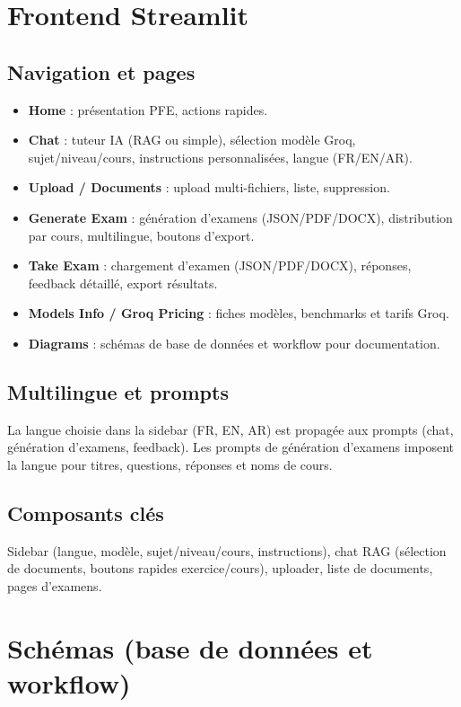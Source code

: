 \section{Frontend Streamlit}

\subsection{Navigation et pages}
\begin{itemize}
    \item \textbf{Home} : présentation PFE, actions rapides.
    \item \textbf{Chat} : tuteur IA (RAG ou simple), sélection modèle Groq, sujet/niveau/cours, instructions personnalisées, langue (FR/EN/AR).
    \item \textbf{Upload / Documents} : upload multi-fichiers, liste, suppression.
    \item \textbf{Generate Exam} : génération d'examens (JSON/PDF/DOCX), distribution par cours, multilingue, boutons d'export.
    \item \textbf{Take Exam} : chargement d'examen (JSON/PDF/DOCX), réponses, feedback détaillé, export résultats.
    \item \textbf{Models Info / Groq Pricing} : fiches modèles, benchmarks et tarifs Groq.
    \item \textbf{Diagrams} : schémas de base de données et workflow pour documentation.
\end{itemize}

\subsection{Multilingue et prompts}
La langue choisie dans la sidebar (FR, EN, AR) est propagée aux prompts (chat, génération d'examens, feedback). Les prompts de génération d'examens imposent la langue pour titres, questions, réponses et noms de cours.

\subsection{Composants clés}
Sidebar (langue, modèle, sujet/niveau/cours, instructions), chat RAG (sélection de documents, boutons rapides exercice/cours), uploader, liste de documents, pages d'examens.

\section{Schémas (base de données et workflow)}

